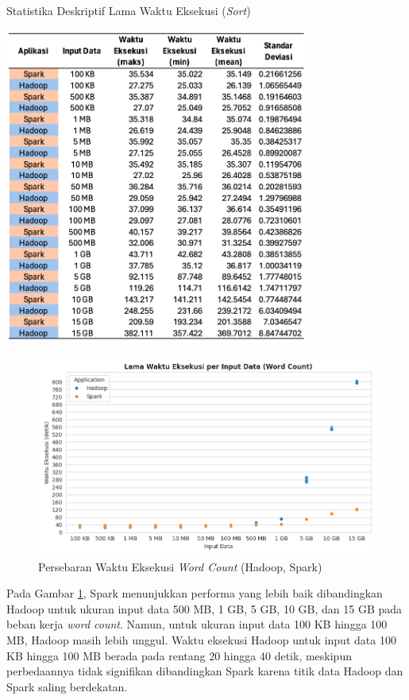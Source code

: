 \begin{table}[h]
  \centering
  \caption{Statistika Deskriptif Lama Waktu Eksekusi (\textit{Sort})}
  \includegraphics[width=0.75\textwidth]{figures/ch04/4-sort-dur-table}
  \label{table:4-sort-dur-table}
\end{table}

\begin{figure}[h]
    \centering
    \includegraphics[width=1\textwidth]{figures/ch04/1-lama-waktu-eksekusi-wordcount.png}
    \caption{Persebaran Waktu Eksekusi \textit{Word Count} (Hadoop, Spark)}
    \label{fig:lama-waktu-eksekusi-wordcount}
\end{figure}

\newpage
Pada Gambar \ref{fig:lama-waktu-eksekusi-wordcount}, Spark menunjukkan performa yang lebih baik dibandingkan Hadoop untuk ukuran input data 500 MB, 1 GB, 5 GB, 10 GB, dan 15 GB pada beban kerja \textit{word count}. Namun, untuk ukuran input data 100 KB hingga 100 MB, Hadoop masih lebih unggul. Waktu eksekusi Hadoop untuk input data 100 KB hingga 100 MB berada pada rentang 20 hingga 40 detik, meskipun perbedaannya tidak signifikan dibandingkan Spark karena titik data Hadoop dan Spark saling berdekatan.

